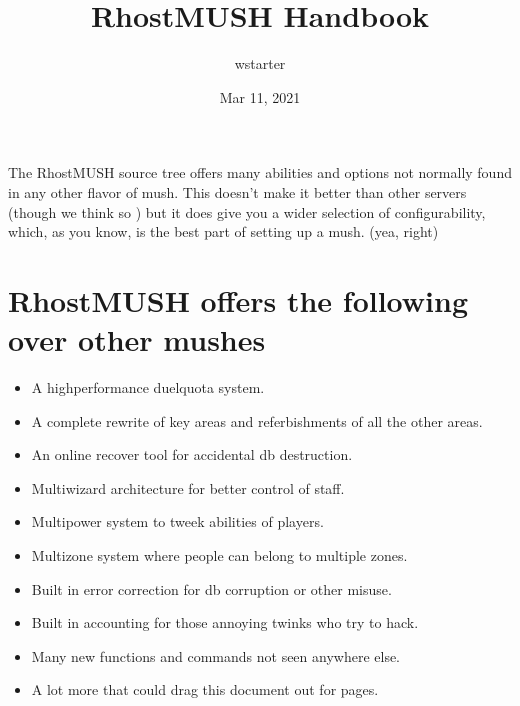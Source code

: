 \documentclass[letterpaper,10pt,english]{sphinxmanual}
\title{RhostMUSH Handbook}
\date{Mar 11, 2021}
\author{wstarter}
\begin{document}
\pagestyle{empty}
\sphinxmaketitle
\pagestyle{plain}
\sphinxtableofcontents
\pagestyle{normal}
\label{\detokenize{index::doc}}


\sphinxAtStartPar
The RhostMUSH source tree offers many abilities and options
not normally found in any other flavor of mush.  This doesn’t
make it better than other servers (though we think so )
but it does give you a wider selection of configurability,
which, as you know, is the best part of setting up a mush.
(yea, right)


\chapter{RhostMUSH offers the following over other mushes}
\label{\detokenize{index:rhostmush-offers-the-following-over-other-mushes}}\begin{itemize}
\item {} 
\sphinxAtStartPar
A high\sphinxhyphen{}performance duel\sphinxhyphen{}quota system.

\item {} 
\sphinxAtStartPar
A complete rewrite of key areas and referbishments of all the other areas.

\item {} 
\sphinxAtStartPar
An on\sphinxhyphen{}line recover tool for accidental db destruction.

\item {} 
\sphinxAtStartPar
Multi\sphinxhyphen{}wizard architecture for better control of staff.

\item {} 
\sphinxAtStartPar
Multi\sphinxhyphen{}power system to tweek abilities of players.

\item {} 
\sphinxAtStartPar
Multi\sphinxhyphen{}zone system where people can belong to multiple zones.

\item {} 
\sphinxAtStartPar
Built in error correction for db corruption or other misuse.

\item {} 
\sphinxAtStartPar
Built in accounting for those annoying twinks who try to hack.

\item {} 
\sphinxAtStartPar
Many new functions and commands not seen anywhere else.

\item {} 
\sphinxAtStartPar
A lot more that could drag this document out for pages.

\end{itemize}
\end{document}
